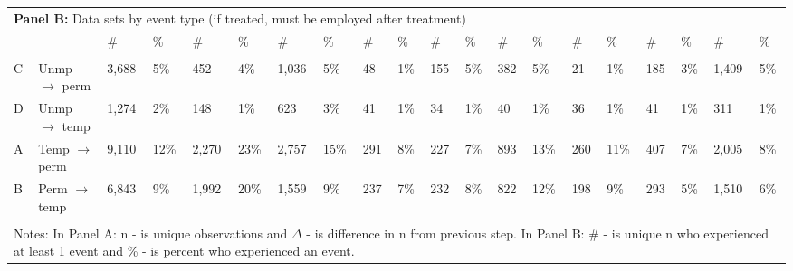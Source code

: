 \begin{tabular}{l>{\raggedright\arraybackslash}p{2.5in}llllllllllllllllll}
\multicolumn{14}{l}{{\bf Panel B:} Data sets by event type (if treated, must be employed after treatment)} \\ 

& 
& \# & \%
& \# & \%
& \# & \%
& \# & \%
& \# & \%
& \# & \%
& \# & \%
& \# & \%
& \# & \%
\\ 
\cmidrule(lr){1-2}
\cmidrule(lr){3-4}
\cmidrule(lr){5-6}
\cmidrule(lr){7-8}
\cmidrule(lr){9-10}
\cmidrule(lr){11-12}
\cmidrule(lr){13-14}
\cmidrule(lr){15-16}
\cmidrule(lr){17-18}
\cmidrule(lr){19-20}
\\[-1.8ex]  
 
C & Unmp $\rightarrow$ perm & 3,688 & 5\% & 452 & 4\% & 1,036 & 5\% & 48 & 1\% & 155 & 5\% & 382 & 5\% & 21 & 1\% & 185 & 3\% & 1,409 & 5\% \\ 
  D & Unmp $\rightarrow$ temp & 1,274 & 2\% & 148 & 1\% & 623 & 3\% & 41 & 1\% & 34 & 1\% & 40 & 1\% & 36 & 1\% & 41 & 1\% & 311 & 1\% \\ 
  A & Temp $\rightarrow$ perm & 9,110 & 12\% & 2,270 & 23\% & 2,757 & 15\% & 291 & 8\% & 227 & 7\% & 893 & 13\% & 260 & 11\% & 407 & 7\% & 2,005 & 8\% \\ 
  B & Perm $\rightarrow$ temp & 6,843 & 9\% & 1,992 & 20\% & 1,559 & 9\% & 237 & 7\% & 232 & 8\% & 822 & 12\% & 198 & 9\% & 293 & 5\% & 1,510 & 6\% \\ 
   \bottomrule \\[-1.8ex] \multicolumn{20}{p{14in}}{Notes: In Panel A: n - is unique observations and $\Delta$ - is difference in n from previous step.  In Panel B: \# - is unique n who experienced at least 1 event and \% - is percent who experienced an event.} 
\end{tabular}
